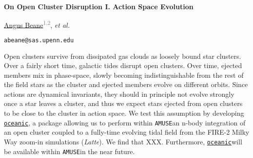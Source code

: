 \documentclass[11pt,letterpaper]{article}
\newcommand{\oceanic}{\href{https://github.com/gusbeane/oceanic}{\texttt{oceanic}}}
\newcommand{\AMUSE}{\texttt{AMUSE}}
\begin{document}
\thispagestyle{firstpage}%
\ifdefined\dark
    \pagecolor{bggrey}
    \color{white}
\fi

\def\parskipdefault{\parskip}
\setlength{\parskip}{1.2ex}

\def\parindentdefault{\parindent}
\setlength{\parindent}{0pt}

\textbf{\Large On Open Cluster Disruption I. Action Space Evolution}

\href{https://gusbeane.com}{Angus Beane}\textsuperscript{\textcolor{gray}{\hspace{0.063ex}1,2}}, {\em et al.}

\texttt{abeane@sas.upenn.edu}


\begin{list}{\pubnumber{\therefpubnum}}{\affilist}
\item{}
\item{}
\end{list}



\deemph{\today}

Open clusters survive from dissipated gas clouds as loosely bound star clusters. Over a fairly short time, galactic tides disrupt open clusters. Over time, ejected members mix in phase-space, slowly becoming indistinguishable from the rest of the field stars as the cluster and ejected members evolve on different orbits. Since actions are dynamical invariants, they should in principle not evolve strongly once a star leaves a cluster, and thus we expect stars ejected from open clusters to be close to the cluster in action space. We test this assumption by developing \oceanic, a package allowing us to perform within \AMUSE an n-body integration of an open cluster coupled to a fully-time evolving tidal field from the FIRE-2 Milky Way zoom-in simulations ({\em Latte}). We find that XXX. Furthermore, \oceanic will be available within \AMUSE in the near future.



\setlength{\parskip}{\parskipdefault}
\setlength{\parindent}{\parindentdefault}
\end{document}
